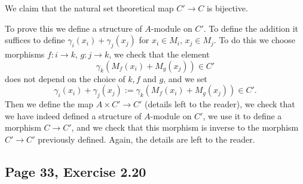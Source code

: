 \documentclass[parskip=half,fontsize=12pt]{scrartcl}%
\begin{document}
We claim that the natural set theoretical map $C'\to C$ is bijective. 

To prove this we define a structure of $A$-module on $C'$. To define the addition it suffices to define $\gamma_i(x_i)+\gamma_j(x_j)$ for $x_i\in M_i$, $x_j\in M_j$. To do this we choose morphisms $f:i\to k$, $g:j\to k$, we check that the element 
$$
\gamma_k(M_f(x_i)+M_g(x_j))\in C'
$$ 
does not depend on the choice of $k,f$ and $g$, and we set 
$$
\gamma_i(x_i)+\gamma_j(x_j):=\gamma_k(M_f(x_i)+M_g(x_j))\in C'.
$$ 
Then we define the map $A\times C'\to C'$ (details left to the reader), we check that we have indeed defined a structure of $A$-module on $C'$, we use it to define a morphism $C\to C'$, and we check that this morphism is inverse to the morphism $C'\to C'$ previously defined. Again, the details are left to the reader. 

%
\begin{comment}
\subsection{Page 33, Exercise 2.15}%

The proof of the following statements is left to the reader.

\emph{There is a unique equivalence relation $\sim$ on the disjoint union $M'$ of the $M_i$ such that, for any $x\in M_i$ and any $y$ in $M_j$, we have $x\sim y$ if and only if there is a $k\ge i,j$ with $\mu_{ki}(x)=\mu_{kj}(\,y)$.}

[I denote by $\mu_{ki}$ what the book denotes by $\mu_{ik}$.]

Then $M'/\sim$ is a direct limit of the $M_i$ in the category of sets. 

Let $p:M'\to M'/\sim$ be the canonical projection. 

There is a unique structure of $A$-module on $M'/\sim$ such that 

$\bullet\ ap(x)=p(ax)$ for all $i$ in $I$, all $x$ in $M_i$ and all $a$ in $A$, 

$\bullet\ p(x)+p(\,y)=p(\mu_{ki}(x)+\mu_{kj}(\,y))$ for all $k\ge i,j$ in $I$, all $x$ in $M_i$ and all $y$ in $M_j$. 

The quotient $M'/\sim$ is a direct limit of the $M_i$ also in the category of $A$-modules.
\end{comment}
%

\subsection{Page 33, Exercise 2.20}%
\end{document}
